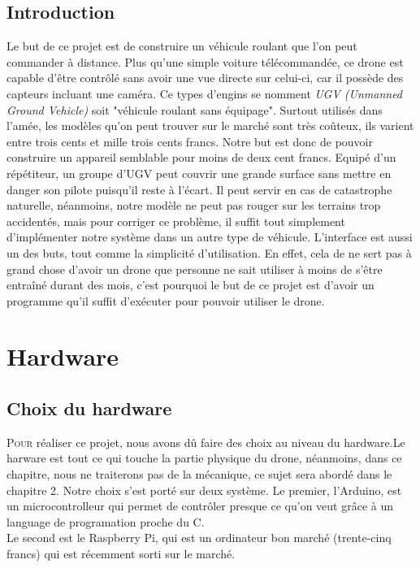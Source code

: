 \documentclass[a4paper,12pt]{report}
\begin{document}
{\section*{Introduction}
Le but de ce projet est de construire un véhicule roulant que l'on peut commander à distance. Plus qu'une simple voiture télécommandée, ce drone est capable d'être contrôlé sans avoir une vue directe sur celui-ci, car il possède des capteurs incluant une caméra. Ce types d'engins se nomment \textit{UGV (Unmanned Ground Vehicle)} soit "véhicule roulant sans équipage". Surtout utilisés dans l'amée, les modèles qu'on peut trouver sur le marché sont très coûteux, ils varient entre trois cents et mille trois cents francs. Notre but est donc de pouvoir construire un appareil semblable pour moins de deux cent francs. Equipé d'un répétiteur, un groupe d'UGV peut couvrir une grande surface sans mettre en danger son pilote puisqu'il reste à l'écart. Il peut servir en cas de catastrophe naturelle, néanmoins, notre modèle ne peut pas rouger sur les terrains trop accidentés, mais pour corriger ce problème, il suffit tout simplement d'implémenter notre système dans un autre type de véhicule. L'interface est aussi un des buts, tout comme la simplicité d'utilisation. En effet, cela de ne sert pas à grand chose d'avoir un drone que personne ne sait utiliser à moins de s'être entraîné durant des mois, c'est pourquoi le but de ce projet est d'avoir un programme qu'il suffit d'exécuter pour pouvoir utiliser le drone. 
\clearpage


\chapter{Hardware}

\section{Choix du hardware}
\lettrine{P}{our} réaliser ce projet, nous avons dû faire des choix au niveau du hardware.Le harware est tout ce qui touche la partie physique du drone, néanmoins, dans ce chapitre, nous ne traiterons pas de la mécanique, ce sujet sera abordé dans le chapitre 2. Notre choix s'est porté sur deux système. Le premier, l'Arduino, est un microcontrolleur qui permet de contrôler presque ce qu'on veut grâce à un language de programation proche du C.\\
Le second est le Raspberry Pi, qui est un ordinateur bon marché (trente-cinq francs) qui est récemment sorti sur le marché. 


}
\end{document}
